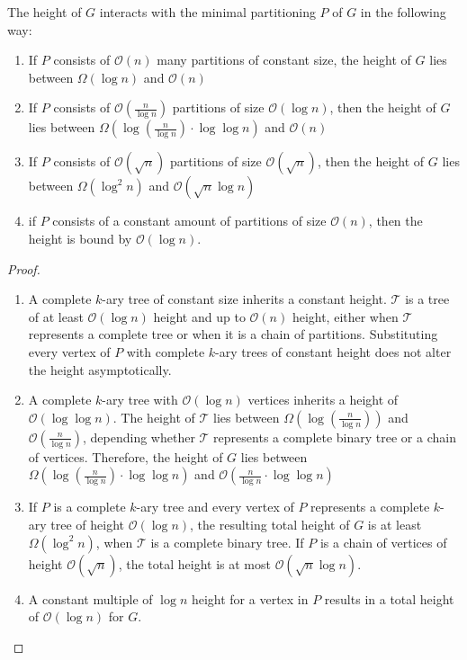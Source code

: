 \begin{lemma}\label{l:partition_binary_tree_lower_upper_bounds}
	The height of $G$ interacts with the minimal partitioning $P$ of $G$ in the following way:
	\begin{enumerate}
		\item If $P$ consists of $\mathcal{O}(n)$ many partitions of constant size, the height of $G$ lies between $\Omega(\log n)$ and $\mathcal{O}(n)$
		\item If $P$ consists of $\mathcal{O}\left(\frac{n}{\log n}\right)$ partitions of size $\mathcal{O}(\log n)$, then the height of $G$ lies between $\Omega\left(\log\left(\frac{n}{\log n}\right)\cdot \log \log n \right)$ and $\mathcal{O}\left( n\right)$
		\item If $P$ consists of $\mathcal{O}(\sqrt{n})$ partitions of size $\mathcal{O}(\sqrt{n})$, then the height of $G$ lies between $\Omega(\log^2 n)$ and $\mathcal{O}(\sqrt{n}\log n)$
		\item if $P$ consists of a constant amount of partitions of size $\mathcal{O}(n)$, then the height is bound by $\mathcal{O}(\log n)$.
	\end{enumerate}
\end{lemma}
\begin{proof}
	\begin{enumerate}
		\item A complete $k$-ary tree of constant size inherits a constant height. $\mathcal{T}$ is a tree of at least $\mathcal{O}(\log n)$ height and up to $\mathcal{O}(n)$ height, either when $\mathcal{T}$ represents a complete tree or when it is a chain of partitions. Substituting every vertex of $P$ with complete $k$-ary trees of constant height does not alter the height asymptotically.
		\item A complete $k$-ary tree with $\mathcal{O}(\log n)$ vertices inherits a height of $\mathcal{O}(\log \log n)$. The height of $\mathcal{T}$ lies between $\Omega\left(\log\left(\frac{n}{\log n}\right)\right)$ and $\mathcal{O}\left(\frac{n}{\log n}\right)$, depending whether $\mathcal{T}$ represents a complete binary tree or a chain of vertices. Therefore, the height of $G$ lies between $\Omega\left(\log\left(\frac{n}{\log n}\right)\cdot \log \log n \right)$ and $\mathcal{O}\left(\frac{n}{\log n}\cdot \log \log n\right)$
		\item If $P$ is a complete $k$-ary tree and every vertex of $P$ represents a complete $k$-ary tree of height $\mathcal{O}(\log n)$, the resulting total height of $G$ is at least $\Omega(\log^2 n)$, when $\mathcal{T}$ is a complete binary tree. If $P$ is a chain of vertices of height $\mathcal{O}(\sqrt{n})$, the total height is at most $\mathcal{O}(\sqrt{n} \log n)$. 
		\item A constant multiple of $\log n$ height for a vertex in $P$ results in a total height of $\mathcal{O}(\log n)$ for $G$.
	\end{enumerate}
\end{proof}

